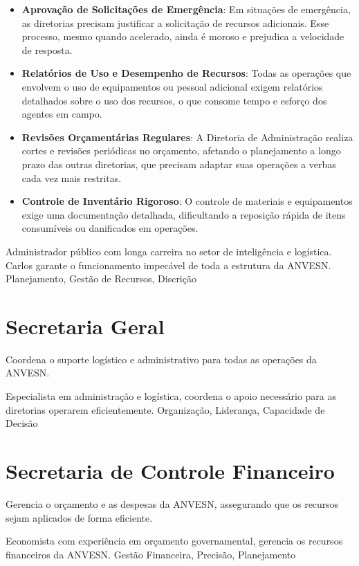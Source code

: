 \begin{itemize}
    \item \textbf{Aprovação de Solicitações de Emergência}: Em situações de emergência, as diretorias precisam justificar a solicitação de recursos adicionais. Esse processo, mesmo quando acelerado, ainda é moroso e prejudica a velocidade de resposta.
    \item \textbf{Relatórios de Uso e Desempenho de Recursos}: Todas as operações que envolvem o uso de equipamentos ou pessoal adicional exigem relatórios detalhados sobre o uso dos recursos, o que consome tempo e esforço dos agentes em campo.
    \item \textbf{Revisões Orçamentárias Regulares}: A Diretoria de Administração realiza cortes e revisões periódicas no orçamento, afetando o planejamento a longo prazo das outras diretorias, que precisam adaptar suas operações a verbas cada vez mais restritas.
    \item \textbf{Controle de Inventário Rigoroso}: O controle de materiais e equipamentos exige uma documentação detalhada, dificultando a reposição rápida de itens consumíveis ou danificados em operações.
\end{itemize}




{Administrador público com longa carreira no setor de inteligência e logística. Carlos garante o funcionamento impecável de toda a estrutura da ANVESN.}
{Planejamento, Gestão de Recursos, Discrição}

\section{Secretaria Geral}
Coordena o suporte logístico e administrativo para todas as operações da ANVESN.

{Especialista em administração e logística, coordena o apoio necessário para as diretorias operarem eficientemente.}
{Organização, Liderança, Capacidade de Decisão}

\section{Secretaria de Controle Financeiro}
Gerencia o orçamento e as despesas da ANVESN, assegurando que os recursos sejam aplicados de forma eficiente.

{Economista com experiência em orçamento governamental, gerencia os recursos financeiros da ANVESN.}
{Gestão Financeira, Precisão, Planejamento}

